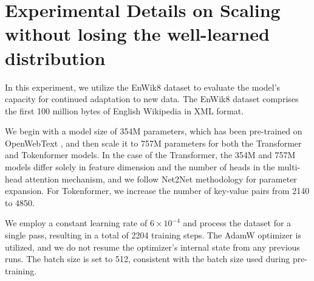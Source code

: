\documentclass{article} %
\newcommand{\ourmethod}{Tokenformer\xspace}
\begin{document}
\section{Experimental Details on Scaling without losing the well-learned distribution}
In this experiment, we utilize the EnWik8 \citep{mahoney2011large} dataset to evaluate the model's capacity for continued adaptation to new data. The EnWik8 dataset comprises the first 100 million bytes of English Wikipedia in XML format. 

We begin with a model size of 354M parameters, which has been pre-trained on OpenWebText \citep{Gokaslan2019OpenWeb}, and then scale it to 757M parameters for both the Transformer and \ourmethod models. In the case of the Transformer, the 354M and 757M models differ solely in feature dimension and the number of heads in the multi-head attention mechanism, and we follow Net2Net\citep{chen2015net2net} methodology for parameter expansion. For \ourmethod, we increase the number of key-value pairs from 2140 to 4850.

We employ a constant learning rate of $6 \times 10^{-4}$ and process the dataset for a single pass, resulting in a total of 2204 training steps. The AdamW optimizer \citep{loshchilov2017decoupled} is utilized, and we do not resume the optimizer's internal state from any previous runs. The batch size is set to 512, consistent with the batch size used during pre-training.
\end{document}
